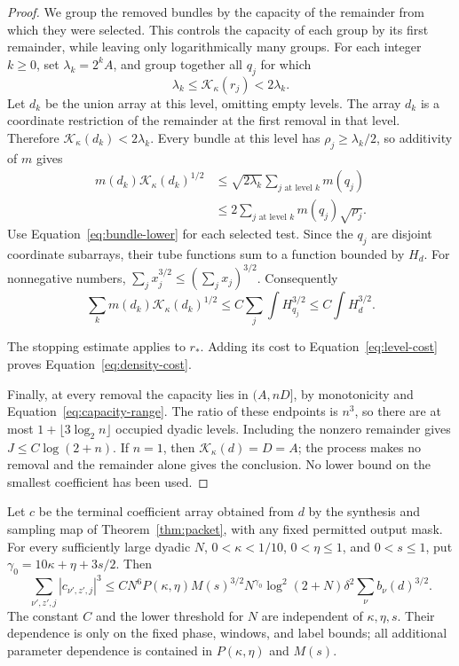 \begin{proof}
We group the removed bundles by the capacity of the remainder from
which they were selected. This controls the capacity of each group
by its first remainder, while leaving only logarithmically many groups.
For each integer \(k\ge0\), set \(\lambda_k=2^kA\), and group
together all \(q_j\) for which
\[
 \lambda_k\le\mathcal K_\kappa(r_j)<2\lambda_k.
\]
Let \(d_k\) be the union array at this level, omitting empty levels.
The array \(d_k\) is a coordinate restriction of the remainder at
the first removal in that level. Therefore
\(\mathcal K_\kappa(d_k)<2\lambda_k\). Every bundle at this level
has \(\rho_j\ge\lambda_k/2\), so additivity of \(m\) gives
\[
\begin{split}
 m(d_k)\mathcal K_\kappa(d_k)^{1/2}
 &\le \sqrt{2\lambda_k}\sum_{j\text{ at level }k}m(q_j)\\
 &\le 2\sum_{j\text{ at level }k}m(q_j)\sqrt{\rho_j}.
\end{split}
\]
Use Equation~\eqref{eq:bundle-lower} for each selected test. Since the
\(q_j\) are disjoint coordinate subarrays, their tube functions sum
to a function bounded by \(H_d\). For nonnegative numbers,
\(\sum_j x_j^{3/2}\le(\sum_jx_j)^{3/2}\). Consequently
\begin{equation}\label{eq:level-cost}
 \sum_km(d_k)\mathcal K_\kappa(d_k)^{1/2}
 \le C\sum_j\int H_{q_j}^{3/2}
 \le C\int H_d^{3/2}.
\end{equation}

The stopping estimate applies to \(r_*\). Adding its cost to
Equation~\eqref{eq:level-cost} proves
Equation~\eqref{eq:density-cost}.

Finally, at every removal the capacity lies in \((A,nD]\), by
monotonicity and Equation~\eqref{eq:capacity-range}. The ratio of these
endpoints is \(n^3\), so there are at most
\(1+\lfloor3\log_2 n\rfloor\) occupied dyadic levels. Including
the nonzero remainder gives \(J\le C\log(2+n)\). If \(n=1\),
then \(\mathcal K_\kappa(d)=D=A\); the process makes no removal
and the remainder alone gives the conclusion. No lower bound on the
smallest coefficient has been used.
\end{proof}

\begin{proposition}\label{prop:discrete}
Let \(c\) be the terminal coefficient array obtained from \(d\) by
the synthesis and sampling map of Theorem~\ref{thm:packet}, with any
fixed permitted output mask. For every sufficiently large dyadic \(N\),
\(0<\kappa<1/10\), \(0<\eta\le1\), and \(0<s\le1\), put
\(\gamma_0=10\kappa+\eta+3s/2\). Then
\begin{equation}\label{eq:discrete-critical}
 \sum_{\nu',z',j}|c_{\nu',z',j}|^3
 \le C N^6 P(\kappa,\eta)M(s)^{3/2}
             N^{\gamma_0}\log^2(2+N)
             \delta^2\sum_\nu b_\nu(d)^{3/2}.
\end{equation}
The constant \(C\) and the lower threshold for \(N\) are independent
of \(\kappa,\eta,s\). Their dependence is only on the fixed phase,
windows, and label bounds; all additional parameter dependence is
contained in \(P(\kappa,\eta)\) and \(M(s)\).
\end{proposition}

